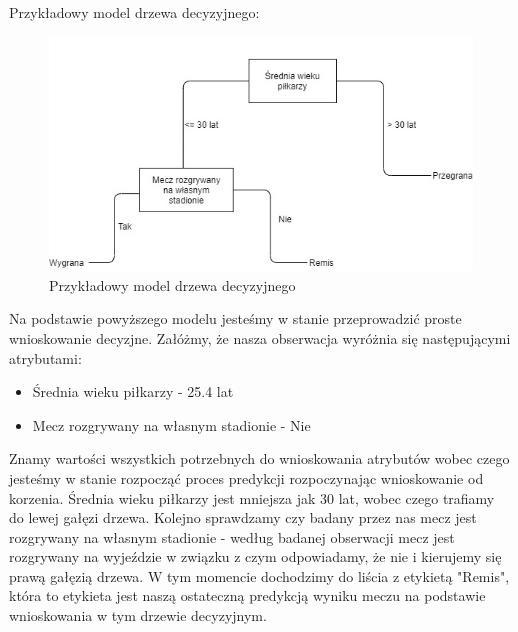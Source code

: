 Przykładowy model drzewa decyzyjnego:
\begin{figure}[h] 
        \includegraphics[width=14cm]{figures/decTree.jpg}
        \caption{Przykładowy model drzewa decyzyjnego}
\end{figure}

Na podstawie powyższego modelu jesteśmy w stanie przeprowadzić proste wnioskowanie decyzjne. Załóżmy, że nasza obserwacja wyróżnia się następującymi atrybutami:
\begin{itemize}
    \item Średnia wieku piłkarzy - 25.4 lat
    \item Mecz rozgrywany na własnym stadionie - Nie
\end{itemize}
Znamy wartości wszystkich potrzebnych do wnioskowania atrybutów wobec czego jesteśmy w stanie rozpocząć proces predykcji rozpoczynając wnioskowanie od korzenia. Średnia wieku piłkarzy jest mniejsza jak 30 lat, wobec czego trafiamy do lewej gałęzi drzewa. Kolejno sprawdzamy czy badany przez nas mecz jest rozgrywany na własnym stadionie - według badanej obserwacji mecz jest rozgrywany na wyjeździe w związku z czym odpowiadamy, że nie i kierujemy się prawą gałęzią drzewa. W tym momencie dochodzimy do liścia z etykietą "Remis", która to etykieta jest naszą ostateczną predykcją wyniku meczu na podstawie wnioskowania w tym drzewie decyzyjnym.\\

